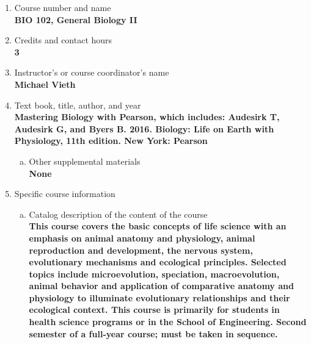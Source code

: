 \label{BIO102}  %
\begin{enumerate}[1.]
\item Course number and name\\
  {\bfseries
    BIO 102, General Biology II
  }

\item Credits and contact hours\\
  {\bfseries
    3
  }

\item Instructor's or course coordinator's name\\
  {\bfseries
    Michael Vieth
  }

\item Text book, title, author, and year\\
  {\bfseries
    Mastering Biology with Pearson, which includes: Audesirk T, Audesirk G, and Byers B. 2016. Biology: Life on Earth with Physiology, 11th edition.  New York: Pearson
  }
\begin{enumerate}[a.]
\item Other supplemental materials\\
  {\bfseries
   None
  }
\end{enumerate}

\item Specific course information
\begin{enumerate}[a.]
\item Catalog description of the content of the course\\
  {\bfseries
This course covers the basic concepts of life science with an emphasis on animal anatomy and physiology, animal reproduction and development, the nervous system, evolutionary mechanisms and ecological principles. Selected topics include microevolution, speciation, macroevolution, animal behavior and application of comparative anatomy and physiology to illuminate evolutionary relationships and their ecological context. This course is primarily for students in health science programs or in the School of Engineering. Second semester of a full-year course; must be taken in sequence.
  }


\end{enumerate}
\end{enumerate}
